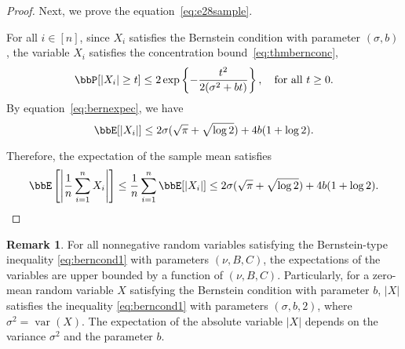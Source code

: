 \documentclass[11pt]{article}
\DeclareMathOperator{\var}{var}
\newcommand{\off}[1]{\left[#1\right]}
\newcommand{\offf}[1]{\left\{#1\right\}}
\newcommand{\aabs}[1]{\left|#1\right|}
\theoremstyle{plain}
\theoremstyle{definition}
\newtheorem{rmk}{Remark}
\begin{document}
\begin{proof}
	\vspace{0.2cm}
	Next, we prove the equation~\eqref{eq:e28sample}.
	
	\vspace{0.2cm}
	For all $i \in [n]$, since $X_i$ satisfies the Bernstein condition with parameter $(\sigma,b)$, the variable $X_i$ satisfies the concentration bound~\eqref{eq:thmbernconc},
	\begin{equation}
		\bbP[|X_i| \geq t] \leq 2 \exp \offf{- \frac{t^2}{2(\sigma^2 + bt)}}, \quad \text{for all }t \geq 0. 
	\end{equation}
	By equation~\eqref{eq:bernexpec}, we have
	\begin{equation}
		\bbE[|X_i|] \leq  2 \sigma (\sqrt{\pi} + \sqrt{\log 2}) + 4b (1 + \log 2).
	\end{equation}
	
	Therefore, the expectation of the sample mean satisfies
	\begin{equation}
		\bbE \off{ \aabs{\frac{1}{n} \sum_{i=1}^n X_i }} \leq \frac{1}{n} \sum_{i=1}^n \bbE[|X_i|] \leq 2 \sigma (\sqrt{\pi} + \sqrt{\log 2}) + 4b (1 + \log 2).
	\end{equation}
	
\end{proof}

\begin{rmk}
	For all nonnegative random variables satisfying the Bernstein-type inequality \eqref{eq:berncond1} with parameters $(\nu,B,C)$, the expectations of the variables are upper bounded by a function of $(\nu,B,C)$. Particularly, for a zero-mean random variable $X$ satisfying the Bernstein condition with parameter $b$, $|X|$ satisfies the inequality \eqref{eq:berncond1} with parameters $(\sigma,b,2)$, where $\sigma^2 = \var(X)$.  The expectation of the absolute variable $|X|$ depends on the variance $\sigma^2$ and the parameter $b$.
\end{rmk}
\end{document}
